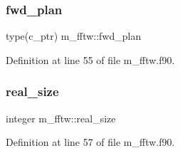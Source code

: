 \subsubsection{\texorpdfstring{fwd\+\_\+plan}{fwd\_plan}}
{\footnotesize\ttfamily type(c\+\_\+ptr) m\+\_\+fftw\+::fwd\+\_\+plan}



Definition at line 55 of file m\+\_\+fftw.\+f90.

\mbox{\label{namespacem__fftw_a7963f79188a7191b7d8436707e2aa4a5}} 
\subsubsection{\texorpdfstring{real\+\_\+size}{real\_size}}
{\footnotesize\ttfamily integer m\+\_\+fftw\+::real\+\_\+size}



Definition at line 57 of file m\+\_\+fftw.\+f90.

